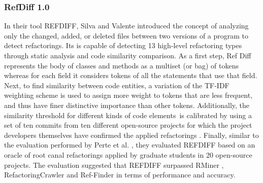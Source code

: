 \documentclass[letterpaper,12pt,onecolumn,final]{report}
\begin{document}
\subsubsection{RefDiff 1.0}
In their tool REFDIFF, Silva and Valente \cite{Silva2017} introduced the concept of analyzing only the changed, added, or deleted files between two versions of a program to detect refactorings. Its is capable of detecting 13 high-level refactoring types through static analysis and code similarity comparison. As a first step, Ref Diff represents the body of classes and methods as a multiset (or bag) of tokens whereas for each field it considers tokens of all the statements that use that field. Next, to find similarity between code entities, a variation of the TF-IDF weighting scheme \cite{Salton1986} is used to assign more weight to tokens that are less frequent, and thus have finer distinctive importance than other tokens. Additionally, the similarity threshold for different kinds of code elements is calibrated by using a set of ten commits from ten different open-source projects for which the project developers themselves have confirmed the applied refactorings \cite{Silva2016}. Finally, similar to the evaluation performed by Perte et al. \cite{Prete2010}, they evaluated REFDIFF based on an oracle of root canal refactorings applied by graduate students in 20 open-source projects. The evaluation suggested that REFDIFF surpassed RMiner \cite{Silva2016}, RefactoringCrawler \cite{Dig2006} and Ref-Finder \cite{Prete2010} in terms of performance and accuracy.
\end{document}
